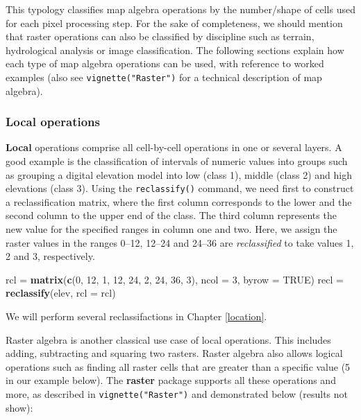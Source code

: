 \documentclass[]{krantz}
\newenvironment{Shaded}{\begin{snugshade}}{\end{snugshade}}
\newcommand{\DataTypeTok}[1]{\textcolor[rgb]{0.27,0.27,0.27}{#1}}
\newcommand{\DecValTok}[1]{\textcolor[rgb]{0.06,0.06,0.06}{#1}}
\newcommand{\KeywordTok}[1]{\textcolor[rgb]{0.27,0.27,0.27}{\textbf{#1}}}
\newcommand{\NormalTok}[1]{#1}
\newcommand{\OtherTok}[1]{\textcolor[rgb]{0.37,0.37,0.37}{#1}}
\newcommand{\StringTok}[1]{\textcolor[rgb]{0.5,0.5,0.5}{#1}}
\begin{document}
This typology classifies map algebra operations by the number/shape of cells used for each pixel processing step.
For the sake of completeness, we should mention that raster operations can also be classified by discipline such as terrain, hydrological analysis or image classification.
The following sections explain how each type of map algebra operations can be used, with reference to worked examples (also see \texttt{vignette("Raster")} for a technical description of map algebra).

\hypertarget{local-operations}{%
\subsubsection{Local operations}\label{local-operations}}

\textbf{Local} operations comprise all cell-by-cell operations in one or several layers.
A good example is the classification of intervals of numeric values into groups such as grouping a digital elevation model into low (class 1), middle (class 2) and high elevations (class 3).
Using the \texttt{reclassify()} command, we need first to construct a reclassification matrix, where the first column corresponds to the lower and the second column to the upper end of the class.
The third column represents the new value for the specified ranges in column one and two.
Here, we assign the raster values in the ranges 0--12, 12--24 and 24--36 are \emph{reclassified} to take values 1, 2 and 3, respectively.

\begin{Shaded}
\begin{Highlighting}[]
\NormalTok{rcl =}\StringTok{ }\KeywordTok{matrix}\NormalTok{(}\KeywordTok{c}\NormalTok{(}\DecValTok{0}\NormalTok{, }\DecValTok{12}\NormalTok{, }\DecValTok{1}\NormalTok{, }\DecValTok{12}\NormalTok{, }\DecValTok{24}\NormalTok{, }\DecValTok{2}\NormalTok{, }\DecValTok{24}\NormalTok{, }\DecValTok{36}\NormalTok{, }\DecValTok{3}\NormalTok{), }\DataTypeTok{ncol =} \DecValTok{3}\NormalTok{, }\DataTypeTok{byrow =} \OtherTok{TRUE}\NormalTok{)}
\NormalTok{recl =}\StringTok{ }\KeywordTok{reclassify}\NormalTok{(elev, }\DataTypeTok{rcl =}\NormalTok{ rcl)}
\end{Highlighting}
\end{Shaded}

We will perform several reclassifactions in Chapter \ref{location}.

Raster algebra is another classical use case of local operations.
This includes adding, subtracting and squaring two rasters.
Raster algebra also allows logical operations such as finding all raster cells that are greater than a specific value (5 in our example below).
The \textbf{raster} package supports all these operations and more, as described in \texttt{vignette("Raster")} and demonstrated below (results not show):
\end{document}
